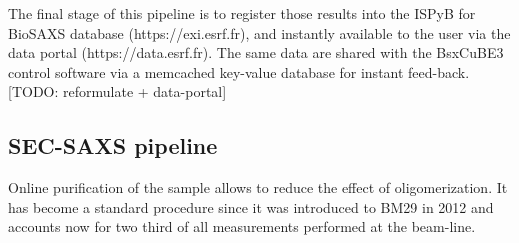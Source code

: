 \documentclass[preprint]{iucr}              %
\begin{document}


The final stage of this pipeline is to register those results into the ISPyB for BioSAXS database \cite{ISPYBB} (https://exi.esrf.fr), and instantly available to the user via the data portal (https://data.esrf.fr). 
The same data are shared with the BsxCuBE3 control software via a memcached key-value database for instant feed-back.
[TODO: reformulate + data-portal]
\subsection{SEC-SAXS pipeline}
Online purification of the sample allows to reduce the effect of oligomerization.
It has become a standard procedure since it was introduced to BM29 in 2012 \cite{SECPaper2012} and accounts now for two third of all measurements performed at the beam-line.
\end{document}
